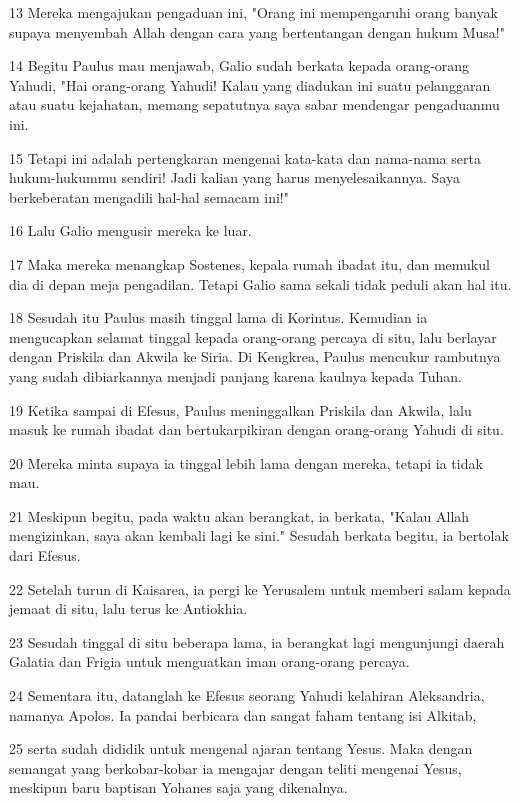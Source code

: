 \par 13 Mereka mengajukan pengaduan ini, "Orang ini mempengaruhi orang banyak supaya menyembah Allah dengan cara yang bertentangan dengan hukum Musa!"
\par 14 Begitu Paulus mau menjawab, Galio sudah berkata kepada orang-orang Yahudi, "Hai orang-orang Yahudi! Kalau yang diadukan ini suatu pelanggaran atau suatu kejahatan, memang sepatutnya saya sabar mendengar pengaduanmu ini.
\par 15 Tetapi ini adalah pertengkaran mengenai kata-kata dan nama-nama serta hukum-hukummu sendiri! Jadi kalian yang harus menyelesaikannya. Saya berkeberatan mengadili hal-hal semacam ini!"
\par 16 Lalu Galio mengusir mereka ke luar.
\par 17 Maka mereka menangkap Sostenes, kepala rumah ibadat itu, dan memukul dia di depan meja pengadilan. Tetapi Galio sama sekali tidak peduli akan hal itu.
\par 18 Sesudah itu Paulus masih tinggal lama di Korintus. Kemudian ia mengucapkan selamat tinggal kepada orang-orang percaya di situ, lalu berlayar dengan Priskila dan Akwila ke Siria. Di Kengkrea, Paulus mencukur rambutnya yang sudah dibiarkannya menjadi panjang karena kaulnya kepada Tuhan.
\par 19 Ketika sampai di Efesus, Paulus meninggalkan Priskila dan Akwila, lalu masuk ke rumah ibadat dan bertukarpikiran dengan orang-orang Yahudi di situ.
\par 20 Mereka minta supaya ia tinggal lebih lama dengan mereka, tetapi ia tidak mau.
\par 21 Meskipun begitu, pada waktu akan berangkat, ia berkata, "Kalau Allah mengizinkan, saya akan kembali lagi ke sini." Sesudah berkata begitu, ia bertolak dari Efesus.
\par 22 Setelah turun di Kaisarea, ia pergi ke Yerusalem untuk memberi salam kepada jemaat di situ, lalu terus ke Antiokhia.
\par 23 Sesudah tinggal di situ beberapa lama, ia berangkat lagi mengunjungi daerah Galatia dan Frigia untuk menguatkan iman orang-orang percaya.
\par 24 Sementara itu, datanglah ke Efesus seorang Yahudi kelahiran Aleksandria, namanya Apolos. Ia pandai berbicara dan sangat faham tentang isi Alkitab,
\par 25 serta sudah dididik untuk mengenal ajaran tentang Yesus. Maka dengan semangat yang berkobar-kobar ia mengajar dengan teliti mengenai Yesus, meskipun baru baptisan Yohanes saja yang dikenalnya.
